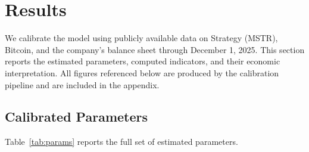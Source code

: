 \section{Results}
\label{sec:results}

We calibrate the model using publicly available data on Strategy (MSTR), Bitcoin, and the company's balance sheet through December 1, 2025. This section reports the estimated parameters, computed indicators, and their economic interpretation. All figures referenced below are produced by the calibration pipeline and are included in the appendix.

\subsection{Calibrated Parameters}

Table~\ref{tab:params} reports the full set of estimated parameters.

